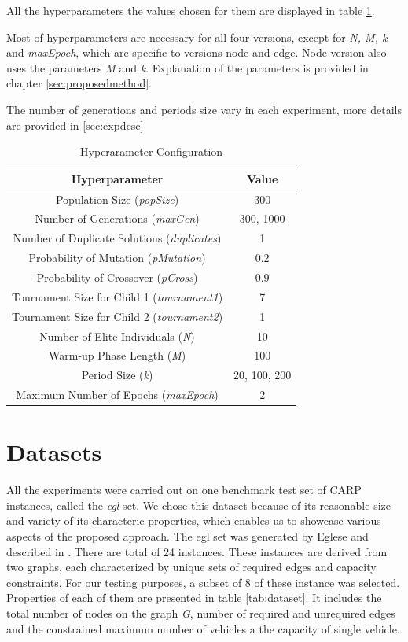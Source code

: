 \documentclass[twoside]{ctuthesis}
\theoremstyle{plain}
\theoremstyle{definition}
\theoremstyle{note}
\begin{document}
All the hyperparameters the values chosen for them are displayed in table \ref{tab:params}. 

Most of hyperparameters are necessary for all four versions, except for \emph{N, M, k} and \emph{maxEpoch}, which are specific to versions node and edge. Node version also uses the parameters \emph{M} and \emph{k}. Explanation of the parameters is provided in chapter \ref{sec:proposedmethod}.

The number of generations and periods size vary in each experiment, more details are provided in \ref{sec:expdesc}

\begin{table}[htbp]
	\centering
	\caption{Hyperarameter Configuration}
	\label{tab:params}
	\begin{tabular}{cc}
		\hline
		\textbf{Hyperparameter} & \textbf{Value} \\
		\hline
		Population Size (\emph{popSize}) & 300 \\
		Number of Generations (\emph{maxGen}) & 300, 1000 \\
		Number of Duplicate Solutions (\emph{duplicates}) & 1 \\
		Probability of Mutation (\emph{pMutation}) & 0.2 \\
		Probability of Crossover (\emph{pCross}) & 0.9 \\
		Tournament Size for Child 1 (\emph{tournament1}) & 7 \\
		Tournament Size for Child 2 (\emph{tournament2}) & 1 \\
		Number of Elite Individuals (\emph{N}) & 10 \\
		Warm-up Phase Length (\emph{M}) & 100 \\
		Period Size (\emph{k}) & 20, 100, 200 \\
		Maximum Number of Epochs (\emph{maxEpoch}) & 2 \\
		\hline
	\end{tabular}
\end{table}


\section{Datasets}
All the experiments were carried out on one benchmark test set of CARP instances, called the \emph{egl} set. We chose this dataset because of its reasonable size and variety of its characteric properties, which enables us to showcase various aspects of the proposed approach. The egl set was generated by Eglese and described in \cite{EGLESE1994231}. There are total of 24 instances. These instances are derived from two graphs, each characterized by unique sets of required edges and capacity constraints. For our testing purposes, a subset of 8 of these instance was selected. Properties of each of them are presented in table \ref{tab:dataset}. It includes the total number of nodes on the graph \emph{G}, number of required and unrequired edges and the constrained maximum number of vehicles a the capacity of single vehicle.
\end{document}
